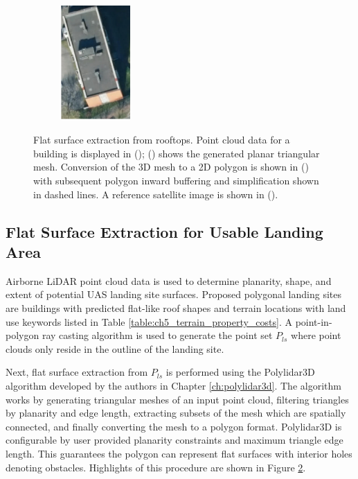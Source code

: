 \begin{figure}[t]
\begin{subfigure}[b]{0.5\linewidth}
    \centering\includegraphics[width=75pt,height=125pt]{chapter_5_mapping/imgs/74200284_satellite_simple.pdf}
    \caption{\label{fig:ch5_satellite_example}}
  \end{subfigure}%
  \caption[Flat surface extraction from rooftops]{Flat surface extraction from rooftops. Point cloud data for a building is displayed in (); () shows the generated planar triangular mesh.  Conversion of the 3D mesh to a 2D polygon is shown in () with subsequent polygon inward buffering and simplification shown in dashed lines.  A reference satellite image is shown in ().}
  \label{fig:ch5_example_usable}
\end{figure}

\subsection{Flat Surface Extraction for Usable Landing Area}\label{sec:ch5_usable_area}

Airborne LiDAR point cloud data is used to determine planarity, shape, and extent of potential \ac{UAS} landing site surfaces.  %
Proposed polygonal landing sites are buildings with predicted flat-like roof shapes and terrain locations with land use keywords listed in Table \ref{table:ch5_terrain_property_costs}.  A point-in-polygon ray casting algorithm is used to generate the point set $P_{ls}$ \cite{samosky_sectionviewsystem_1993} where point clouds only reside in the outline of the landing site. 

Next, flat surface extraction from $P_{ls}$ is performed using the Polylidar3D algorithm developed by the authors in Chapter \ref{ch:polylidar3d}. The algorithm works by generating triangular meshes of an input point cloud, filtering triangles by planarity and edge length, extracting subsets of the mesh which are spatially connected, and finally converting the mesh to a polygon format. Polylidar3D is configurable by user provided planarity constraints and maximum triangle edge length. This guarantees the polygon can represent flat surfaces with interior holes denoting obstacles. Highlights of this procedure are shown in Figure \ref{fig:ch5_example_usable}. 

